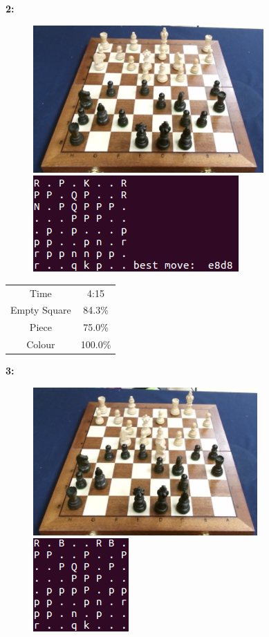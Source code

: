 \documentclass{l4proj}
\begin{document}
\begin{appendices}
\textbf{2:}
\begin{figure}[h!]
\includegraphics[scale=0.8]{ts/ts4.png} \includegraphics[scale=0.75]{ts/tsd4.png}

\label{ts4}
\end{figure}

\begin{table}[h!]
\centering
\begin{tabular}{|c|c|}
	\hline
	Time & 4:15 \\
	\rowcolor{brown!45}Empty Square & 84.3\%  \\
	Piece & 75.0\% \\
	\rowcolor{brown!45} Colour & 100.0\% \\
	\hline
\end{tabular}
\end{table}

\textbf{3:}
\begin{figure}[h!]
\includegraphics[scale=0.8]{ts/ts5.png} \includegraphics[scale=0.75]{ts/tsd5.png}


\end{figure}
\end{appendices}
\end{document}
